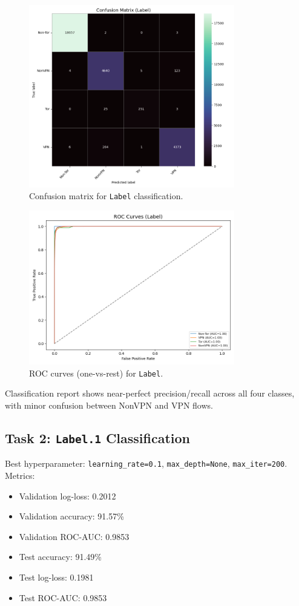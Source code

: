 \documentclass[12pt]{article}
\begin{document}
\begin{figure}[H]
  \centering
  \includegraphics[width=0.8\textwidth]{images/cm_Label.png}
  \caption{Confusion matrix for \texttt{Label} classification.}
  \label{fig:cm_label}
\end{figure}

\begin{figure}[H]
  \centering
  \includegraphics[width=0.8\textwidth]{images/roc_Label.png}
  \caption{ROC curves (one-vs-rest) for \texttt{Label}.}
  \label{fig:roc_label}
\end{figure}

Classification report shows near-perfect precision/recall across all four classes, with minor confusion between NonVPN and VPN flows.

\subsection{Task 2: \texttt{Label.1} Classification}
Best hyperparameter: \texttt{learning\_rate=0.1}, \texttt{max\_depth=None}, \texttt{max\_iter=200}. Metrics:
\begin{itemize}
  \item Validation log-loss: 0.2012
  \item Validation accuracy: 91.57\%
  \item Validation ROC-AUC: 0.9853
  \item Test accuracy: 91.49\%
  \item Test log-loss: 0.1981
  \item Test ROC-AUC: 0.9853
\end{itemize}
\end{document}
